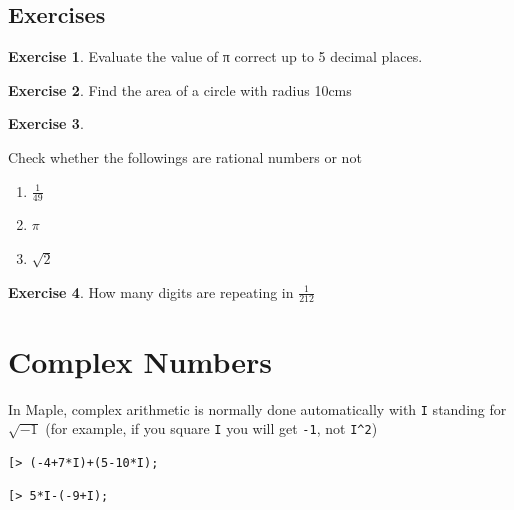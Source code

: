 \documentclass[
]{book}
\providecommand{\tightlist}{%
  \setlength{\itemsep}{0pt}\setlength{\parskip}{0pt}}
\theoremstyle{definition}
\theoremstyle{definition}
\theoremstyle{definition}
\newtheorem{exercise}{Exercise}[chapter]
\theoremstyle{definition}
\theoremstyle{remark}
\begin{document}
\subsection{Exercises}\label{exercises-1}

\begin{exercise}
\protect\hypertarget{exr:unnamed-chunk-6}{}\label{exr:unnamed-chunk-6}Evaluate the value of π correct up to 5 decimal places.
\end{exercise}

\begin{exercise}
\protect\hypertarget{exr:unnamed-chunk-7}{}\label{exr:unnamed-chunk-7}Find the area of a circle with radius 10cms
\end{exercise}

\begin{exercise}
\protect\hypertarget{exr:unnamed-chunk-8}{}\label{exr:unnamed-chunk-8}

Check whether the followings are rational numbers or not

\begin{enumerate}
\def\labelenumi{\roman{enumi}.}
\tightlist
\item
  \(\frac{1}{49}\)
\item
  \(\pi\)
\item
  \(\sqrt{2}\)
\end{enumerate}

\end{exercise}

\begin{exercise}
\protect\hypertarget{exr:unnamed-chunk-9}{}\label{exr:unnamed-chunk-9}How many digits are repeating in \(\frac{1}{212}\)
\end{exercise}

\section{Complex Numbers}\label{complex-numbers}

In Maple, complex arithmetic is normally done automatically with \texttt{I} standing for \(\sqrt{−1}\) (for example, if you square \texttt{I} you will get \texttt{-1}, not \texttt{I\^{}2})

\begin{verbatim}
[> (-4+7*I)+(5-10*I);
\end{verbatim}

\begin{verbatim}
[> 5*I-(-9+I);
\end{verbatim}
\end{document}
